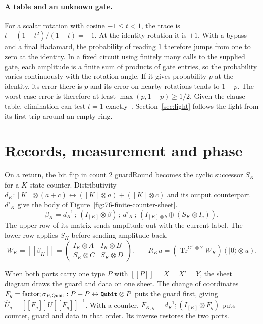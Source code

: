 \documentclass[acmsmall,screen,review,anonymous,nonacm]{acmart}
\newcommand{\C}{\mathbb C}
\newcommand{\storyinlinekwface}{\storyinlineface\bfseries}}
\newcommand{\storyinlineface}{\small\ttfamily}
\newcommand{\storyinlinekwface}{\small\ttfamily\bfseries}
\newcommand{\kw}[1]{\textnormal{\storyinlinekwface #1}}
\newcommand{\code}[1]{\textnormal{\storyinlineface #1}}
\DeclareMathOperator{\Tr}{Tr}
\providecommand{\llbracket}{[\![}
\providecommand{\rrbracket}{]\!]}
\newcommand{\sem}[1]{\llbracket #1 \rrbracket}
\newcommand{\ket}[1]{\lvert #1\rangle}
\numberwithin{equation}{section}
\begin{document}
\paragraph{A table and an unknown gate.}
For a scalar rotation with cosine $-1\le t<1$, the trace is
$t-(1-t^2)/(1-t)=-1$. At the identity rotation it is $+1$.
With a bypass and a final Hadamard, the probability of reading $1$
therefore jumps from one to zero at the identity. In a fixed circuit using finitely many calls to the supplied gate, each amplitude is a finite sum of products
of gate entries, so the probability varies continuously with the rotation angle. If it gives probability $p$ at the identity, its error
there is $p$ and its error on nearby rotations tends to $1-p$.
The worst-case error is therefore at least $\max(p,1-p)\ge1/2$.
Given the clause table, elimination can test $t=1$ exactly~\cite[Remark~B.1]{FairbanksSelinger25Traces}.
Section~\ref{sec:light} follows the light from its first trip around an empty ring.

\section{Records, measurement and phase}\label{app:readings}
On a return, the bit flip in \code{count 2 guardRound} becomes the cyclic
successor $S_K$ for a $K$-state counter. Distributivity
$d_K:[K]\otimes(a+c)\leftrightarrow([K]\otimes a)+([K]\otimes c)$ and its
output counterpart $d'_K$ give the body of Figure~\ref{fig:76-finite-counter-sheet}.
\[
 \beta_K=d_K^{-1}\,;\,(I_{[K]}\otimes\beta)\,;\,d'_K
             \,;\,(I_{[K]\otimes b}\oplus(S_K\otimes I_c)).
\]
The upper row of its matrix sends amplitude out with the current label.
The lower row applies $S_K$ before sending amplitude back.
\[
 W_K=\sem{\beta_K}=\begin{pmatrix}I_K\otimes A&I_K\otimes B\\
                 S_K\otimes C&S_K\otimes D\end{pmatrix}.
 \qquad R_K u=(\Tr^{\C^K\otimes Y}W_K)(\ket0\otimes u).
\]

When both ports carry one type $P$ with $\sem P=X=X'=Y$, the sheet diagram
draws the guard and data on one sheet. The change of coordinates
$F_g=\mathsf{factor};\sigma_{P,\mathsf{Qubit}}:P+P\leftrightarrow
\kw{Qubit}\otimes P$ puts the guard first, giving
$\widehat U_g=\sem{F_g}U\sem{F_g}^{-1}$. With a counter,
$F_{K,g}=d_K^{-1};(I_{[K]}\otimes F_g)$ puts counter, guard and data
in that order. Its inverse restores the two ports.
\end{document}
